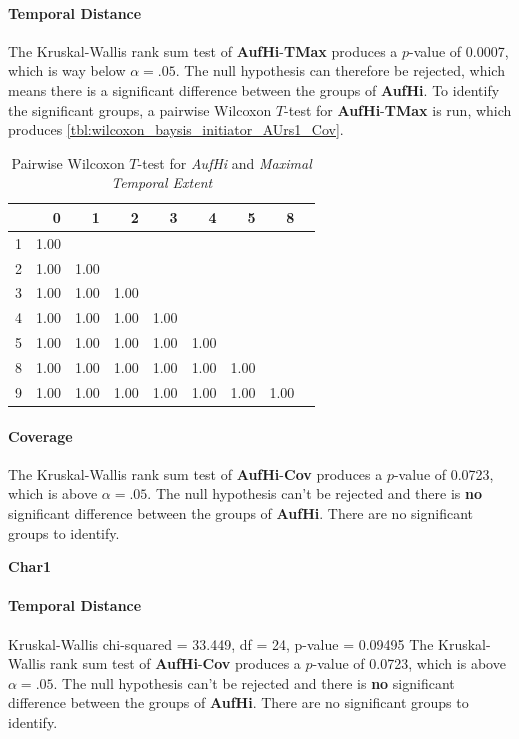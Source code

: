 \paragraph{Temporal Distance}
The Kruskal-Wallis rank sum test of \textbf{AufHi}-\textbf{TMax} produces a $p$-value of 0.0007, which is way below $\alpha=.05$. The null hypothesis can therefore be rejected, which means there is a significant difference between the groups of \textbf{AufHi}. To identify the significant groups, a pairwise Wilcoxon $T$-test for \textbf{AufHi}-\textbf{TMax} is run, which produces \cref{tbl:wilcoxon_baysis_initiator_AUrs1_Cov}. 
\begin{table}[ht]
	\small
	\centering
    \begin{tabular}{rrrrrrrrr}
        \hline
        & 0 & 1 & 2 & 3 & 4 & 5 & 8 \\ 
        \hline
        1 & 1.00 &  &  &  &  &  &  \\ 
        2 & 1.00 & 1.00 &  &  &  &  &  \\ 
        3 & 1.00 & 1.00 & 1.00 &  &  &  &  \\ 
        4 & 1.00 & 1.00 & 1.00 & 1.00 &  &  &  \\ 
        5 & 1.00 & 1.00 & 1.00 & 1.00 & 1.00 &  &  \\ 
        8 & 1.00 & 1.00 & 1.00 & 1.00 & 1.00 & 1.00 &  \\ 
        9 & 1.00 & 1.00 & 1.00 & 1.00 & 1.00 & 1.00 & 1.00 \\ 
        \hline
    \end{tabular}
    \caption{Pairwise Wilcoxon $T$-test for \textit{AufHi} and \textit{Maximal Temporal Extent}}
    \label{tbl:wilcoxon_baysis_initiator_AufHi_TMax}
\end{table}

\paragraph{Coverage}
The Kruskal-Wallis rank sum test of \textbf{AufHi}-\textbf{Cov} produces a $p$-value of 0.0723, which is above $\alpha=.05$. The null hypothesis can't be rejected and there is \textbf{no} significant difference between the groups of \textbf{AufHi}. There are no significant groups to identify.

\Large
\centerline{\textbf{Char1}}
\normalsize

\paragraph{Temporal Distance}
Kruskal-Wallis chi-squared = 33.449, df = 24, p-value = 0.09495
The Kruskal-Wallis rank sum test of \textbf{AufHi}-\textbf{Cov} produces a $p$-value of 0.0723, which is above $\alpha=.05$. The null hypothesis can't be rejected and there is \textbf{no} significant difference between the groups of \textbf{AufHi}. There are no significant groups to identify.


